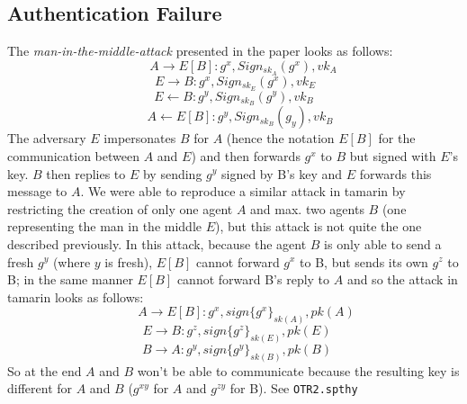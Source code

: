 \documentclass[a4paper,11pt]{scrartcl}
\begin{document}
\subsection{Authentication Failure}
The \textit{man-in-the-middle-attack} presented in the paper looks as follows:
\[ \quad \enspace A \rightarrow E[B] : g^x, Sign_{sk_A} (g^x), vk_A \]
\[ \: E \rightarrow B : g^x, Sign_{sk_E} (g^x), vk_E \]
\[ E \leftarrow B : g^y, Sign_{sk_B} (g^y), vk_B \]
\[ \quad A \leftarrow E[B] : g^y, Sign_{sk_B} (g_y), vk_B \]
The adversary $E$ impersonates $B$ for $A$ (hence the notation $E[B]$ for the communication between $A$ and $E$) and then forwards $g^x$ to $B$ but signed with $E$'s key. $B$ then replies to $E$ by sending $g^y$ signed by B's key and $E$ forwards this message to $A$.
\newline
We were able to reproduce a similar attack in tamarin by restricting the creation of only one agent $A$ and  max. two agents $B$ (one representing the man in the middle $E$), but this attack is not quite the one described previously. In this attack, because the agent $B$ is only able to send a fresh $g^y$ (where $y$ is fresh), $E[B]$ cannot forward $g^x$ to B, but sends its own $g^z$ to B; in the same manner $E[B]$ cannot forward B's reply to $A$ and so the attack in tamarin looks as follows:
\[ \qquad A \rightarrow E[B] : g^x, sign\{g^x\}_{sk(A)}, pk(A) \]
\[ \enspace E \rightarrow B : g^z, sign\{g^z\}_{sk(E)}, pk(E) \]
\[ \enspace B \rightarrow A : g^y, sign\{g^y\}_{sk(B)}, pk(B) \]
So at the end $A$ and $B$ won't be able to communicate because the resulting key is different for $A$ and $B$ ($g^{xy}$ for $A$ and $g^{zy}$ for B).\newline
See \texttt{OTR2.spthy}
\end{document}
